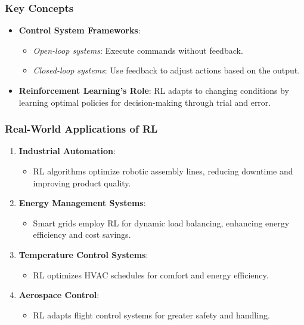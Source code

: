 \documentclass[aspectratio=169]{beamer}
\begin{document}
\begin{frame}[fragile]
    \frametitle{Key Concepts}
    \begin{itemize}
        \item \textbf{Control System Frameworks}:
            \begin{itemize}
                \item \textit{Open-loop systems}: Execute commands without feedback.
                \item \textit{Closed-loop systems}: Use feedback to adjust actions based on the output.
            \end{itemize}
        \item \textbf{Reinforcement Learning's Role}: 
            RL adapts to changing conditions by learning optimal policies for decision-making through trial and error.
    \end{itemize}
\end{frame}

\begin{frame}[fragile]
    \frametitle{Real-World Applications of RL}
    \begin{enumerate}
        \item \textbf{Industrial Automation}:
            \begin{itemize}
                \item RL algorithms optimize robotic assembly lines, reducing downtime and improving product quality.
            \end{itemize}
        \item \textbf{Energy Management Systems}:
            \begin{itemize}
                \item Smart grids employ RL for dynamic load balancing, enhancing energy efficiency and cost savings.
            \end{itemize}
        \item \textbf{Temperature Control Systems}:
            \begin{itemize}
                \item RL optimizes HVAC schedules for comfort and energy efficiency.
            \end{itemize}
        \item \textbf{Aerospace Control}:
            \begin{itemize}
                \item RL adapts flight control systems for greater safety and handling.
            \end{itemize}
    \end{enumerate}
\end{frame}
\end{document}
